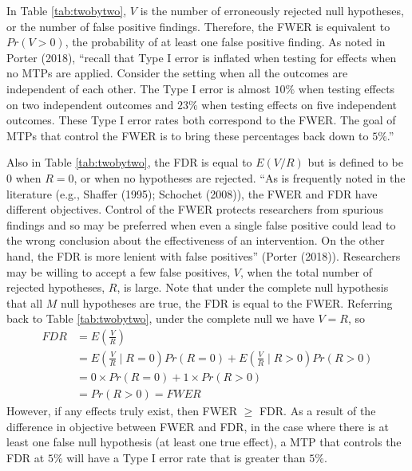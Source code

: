 \documentclass[
]{article}
\begin{document}
In Table \ref{tab:twobytwo}, \(V\) is the number of erroneously rejected
null hypotheses, or the number of false positive findings. Therefore,
the FWER is equivalent to \(Pr(V > 0)\), the probability of at least one
false positive finding. As noted in Porter (2018), ``recall that Type I
error is inflated when testing for effects when no MTPs are applied.
Consider the setting when all the outcomes are independent of each
other. The Type I error is almost \(10\%\) when testing effects on two
independent outcomes and \(23\%\) when testing effects on five
independent outcomes. These Type I error rates both correspond to the
FWER. The goal of MTPs that control the FWER is to bring these
percentages back down to \(5\%\).''

Also in Table \ref{tab:twobytwo}, the FDR is equal to \(E(V/R)\) but is
defined to be \(0\) when \(R=0\), or when no hypotheses are rejected.
``As is frequently noted in the literature (e.g., Shaffer (1995);
Schochet (2008)), the FWER and FDR have different objectives. Control of
the FWER protects researchers from spurious findings and so may be
preferred when even a single false positive could lead to the wrong
conclusion about the effectiveness of an intervention. On the other
hand, the FDR is more lenient with false positives'' (Porter (2018)).
Researchers may be willing to accept a few false positives, \(V\), when
the total number of rejected hypotheses, \(R\), is large. Note that
under the complete null hypothesis that all \(M\) null hypotheses are
true, the FDR is equal to the FWER. Referring back to Table
\ref{tab:twobytwo}, under the complete null we have \(V = R\), so
\begin{align*}
FDR &= E\left(\frac{V}{R}\right)\\
&=  E\left(\frac{V}{R}\mid R = 0\right) Pr(R = 0) + E\left(\frac{V}{R} \mid R > 0\right)Pr(R > 0) \\
&= 0 \times Pr(R = 0) + 1 \times Pr(R > 0) \\
&= Pr(R > 0) = FWER
\end{align*} However, if any effects truly exist, then FWER \(\geq\)
FDR. As a result of the difference in objective between FWER and FDR, in
the case where there is at least one false null hypothesis (at least one
true effect), a MTP that controls the FDR at \(5\%\) will have a Type I
error rate that is greater than \(5\%\).
\end{document}

